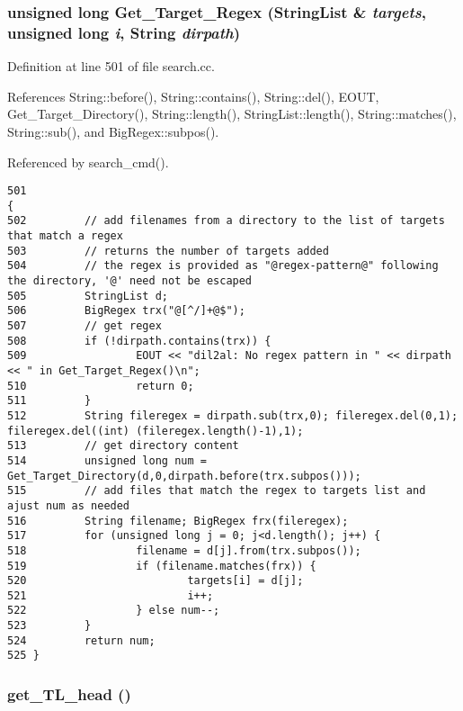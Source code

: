 \subsubsection{\setlength{\rightskip}{0pt plus 5cm}unsigned long Get\_\-Target\_\-Regex ({\bf String\-List} \& {\em targets}, unsigned long {\em i}, {\bf String} {\em dirpath})}\label{dil2al_8hh_a364}




Definition at line 501 of file search.cc.

References String::before(), String::contains(), String::del(), EOUT, Get\_\-Target\_\-Directory(), String::length(), String\-List::length(), String::matches(), String::sub(), and Big\-Regex::subpos().

Referenced by search\_\-cmd().



\footnotesize\begin{verbatim}501                                                                                       {
502         // add filenames from a directory to the list of targets that match a regex
503         // returns the number of targets added
504         // the regex is provided as "@regex-pattern@" following the directory, '@' need not be escaped
505         StringList d;
506         BigRegex trx("@[^/]+@$");
507         // get regex
508         if (!dirpath.contains(trx)) {
509                 EOUT << "dil2al: No regex pattern in " << dirpath << " in Get_Target_Regex()\n";
510                 return 0;
511         }
512         String fileregex = dirpath.sub(trx,0); fileregex.del(0,1); fileregex.del((int) (fileregex.length()-1),1);
513         // get directory content
514         unsigned long num = Get_Target_Directory(d,0,dirpath.before(trx.subpos()));
515         // add files that match the regex to targets list and ajust num as needed
516         String filename; BigRegex frx(fileregex);
517         for (unsigned long j = 0; j<d.length(); j++) {
518                 filename = d[j].from(trx.subpos());
519                 if (filename.matches(frx)) {
520                         targets[i] = d[j];
521                         i++;
522                 } else num--;
523         }
524         return num;
525 }
\end{verbatim}\normalsize 
{}
\subsubsection{ get\_\-TL\_\-head ()}\label{dil2al_8hh_a316}





